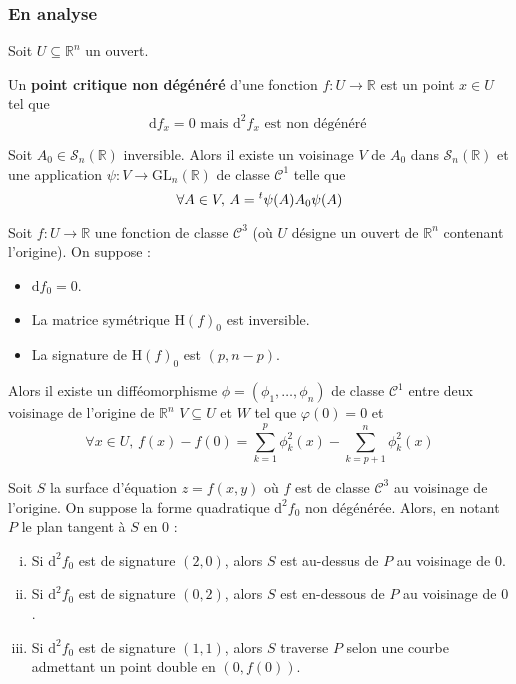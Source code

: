 	\subsubsection{En analyse}
	
	Soit $U \subseteq \mathbb{R}^n$ un ouvert.
	
	
	\begin{definition}
		Un \textbf{point critique non dégénéré} d'une fonction $f : U \rightarrow \mathbb{R}$ est un point $x \in U$ tel que
		\[ \mathrm{d}f_x = 0 \text{ mais } \mathrm{d}^2f_x \text{ est non dégénéré } \]
	\end{definition}
	
	
	\begin{lemma}
		Soit $A_0 \in \mathcal{S}_n(\mathbb{R})$ inversible. Alors il existe un voisinage $V$ de $A_0$ dans $\mathcal{S}_n(\mathbb{R})$ et une application $\psi : V \rightarrow \mathrm{GL}_n(\mathbb{R})$ de classe $\mathcal{C}^1$ telle que
		\[ \forall A \in V, \, A = \mathstrut ^t \psi(A) A_0 \psi(A) \]
	\end{lemma}
	
	
	\begin{lemma}[Morse]
		Soit $f : U \rightarrow \mathbb{R}$ une fonction de classe $\mathcal{C}^3$ (où $U$ désigne un ouvert de $\mathbb{R}^n$ contenant l'origine). On suppose :
		\begin{itemize}
			\item $\mathrm{d} f_0 = 0$.
			\item La matrice symétrique $\mathrm{H} (f)_0$ est inversible.
			\item La signature de $\mathrm{H}(f)_0$ est $(p, n-p)$.
		\end{itemize}
		Alors il existe un difféomorphisme $\phi = (\phi_1, \dots, \phi_n)$ de classe $\mathcal{C}^1$ entre deux voisinage de l'origine de $\mathbb{R}^n$ $V \subseteq U$ et $W$ tel que $\varphi(0) = 0$ et
		\[ \forall x \in U, \, f(x) - f(0) = \sum_{k=1}^p \phi_k^2(x) - \sum_{k=p+1}^n \phi_k^2(x) \]
	\end{lemma}
	
	
	\begin{application}
		Soit $S$ la surface d'équation $z = f(x, y)$ où $f$ est de classe $\mathcal{C}^3$ au voisinage de l'origine. On suppose la forme quadratique $\mathrm{d}^2 f_0$ non dégénérée. Alors, en notant $P$ le plan tangent à $S$ en $0$ :
		\begin{enumerate}[(i)]
			\item Si $\mathrm{d}^2 f_0$ est de signature $(2, 0)$, alors $S$ est au-dessus de $P$ au voisinage de $0$.
			\item Si $\mathrm{d}^2 f_0$ est de signature $(0, 2)$, alors $S$ est en-dessous de $P$ au voisinage de $0$.
			\item Si $\mathrm{d}^2 f_0$ est de signature $(1, 1)$, alors $S$ traverse $P$ selon une courbe admettant un point double en $(0, f(0))$.
		\end{enumerate}
	\end{application}

